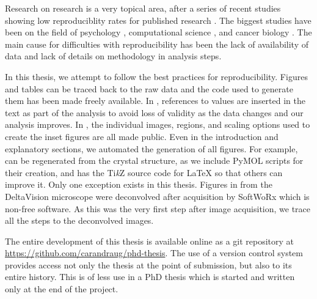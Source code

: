 
Research on research is a very topical area, after a series of recent
studies showing low reproduciblity rates for
published research \citep{ioannidis2015meta}.  The
biggest studies have been on the field of
psychology \citep{open2015estimating},
computational science \citep{collberg2016repeatability},
and cancer biology \citep{prinz2011believe, ioannidis2009repeatability}.
The main cause for difficulties with
reproducibility has been the lack of availability of
data and lack of details on methodology in analysis steps.

In this thesis, we attempt to follow the best practices for
reproducibility.  Figures and tables can be traced back to the raw
data and the code used to generate them has been made freely available.  In
, references to values are inserted in the
text as part of the analysis to avoid loss of validity as the data
changes and our analysis improves.  In , the
individual images, regions, and scaling options used to create the
inset figures are all made public.  Even in the introduction and
explanatory sections, we
automated the generation of all figures.  For example,
 can be regenerated from the
crystal structure, as we include PyMOL \citep{PyMOL}
scripts for their creation, and
 has the Ti\textit{k}Z source code
for \LaTeX{} so that
others can improve it.  Only one exception exists in this thesis.  Figures in
 from the DeltaVision microscope were deconvolved after
acquisition by SoftWoRx which is non-free software.  As this was the
very first step after image acquisition, we trace all the steps to the
deconvolved images.


The entire development of this thesis is available online as a git
repository at \url{https://github.com/carandraug/phd-thesis}.  The use
of a version control system provides access not only the thesis at the
point of submission, but also to its entire history.  This is of less use
in a PhD thesis which is started and written only at the end of the
project.

